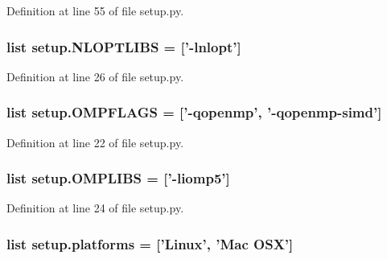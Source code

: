 Definition at line 55 of file setup.\-py.

\hypertarget{namespacesetup_ae8e55c011b0f75d872a51166b37395ae}{
\subsubsection[{N\-L\-O\-P\-T\-L\-I\-B\-S}]{\setlength{\rightskip}{0pt plus 5cm}list setup.\-N\-L\-O\-P\-T\-L\-I\-B\-S = \mbox{[}'-\/lnlopt'\mbox{]}}}\label{namespacesetup_ae8e55c011b0f75d872a51166b37395ae}


Definition at line 26 of file setup.\-py.

\hypertarget{namespacesetup_aa0d1a93d0a5a5a10a02c0cac8dbcaa02}{
\subsubsection[{O\-M\-P\-F\-L\-A\-G\-S}]{\setlength{\rightskip}{0pt plus 5cm}list setup.\-O\-M\-P\-F\-L\-A\-G\-S = \mbox{[}'-\/qopenmp', '-\/qopenmp-\/simd'\mbox{]}}}\label{namespacesetup_aa0d1a93d0a5a5a10a02c0cac8dbcaa02}


Definition at line 22 of file setup.\-py.

\hypertarget{namespacesetup_aad0176b2380288a025c0c71db934ee2d}{
\subsubsection[{O\-M\-P\-L\-I\-B\-S}]{\setlength{\rightskip}{0pt plus 5cm}list setup.\-O\-M\-P\-L\-I\-B\-S = \mbox{[}'-\/liomp5'\mbox{]}}}\label{namespacesetup_aad0176b2380288a025c0c71db934ee2d}


Definition at line 24 of file setup.\-py.

\hypertarget{namespacesetup_a5d7dbf5376a220cd300d93e9a0f48ea4}{
\subsubsection[{platforms}]{\setlength{\rightskip}{0pt plus 5cm}list setup.\-platforms = \mbox{[}'Linux', 'Mac O\-S\-X'\mbox{]}}}\label{namespacesetup_a5d7dbf5376a220cd300d93e9a0f48ea4}


